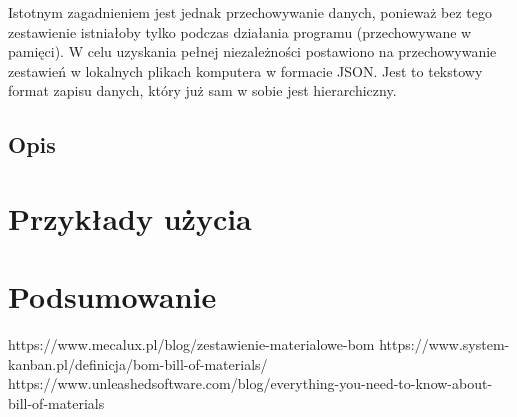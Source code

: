 \documentclass[12pt,twoside]{article}
\begin{document}
Istotnym zagadnieniem jest jednak przechowywanie danych, ponieważ bez tego zestawienie istniałoby tylko podczas działania programu (przechowywane w pamięci). W celu uzyskania pełnej niezależności postawiono na przechowywanie zestawień w lokalnych plikach komputera w formacie JSON. Jest to tekstowy format zapisu danych, który już sam w sobie jest hierarchiczny.

\subsection*{Opis}

\clearpage
\section{Przykłady użycia}

\clearpage
\section{Podsumowanie}

\clearpage

\begin{thebibliography}{8}
\label{sec:bibliography}
https://www.mecalux.pl/blog/zestawienie-materialowe-bom
https://www.system-kanban.pl/definicja/bom-bill-of-materials/
https://www.unleashedsoftware.com/blog/everything-you-need-to-know-about-bill-of-materials
\end{thebibliography}
\clearpage
\end{document}
